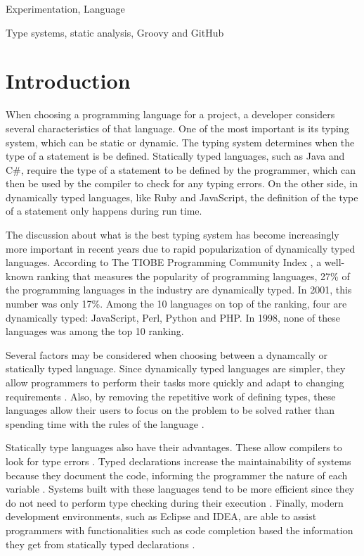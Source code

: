 \documentclass[preprint]{sigplanconf}
\begin{document}

\terms
Experimentation, Language

\keywords
Type systems, static analysis, Groovy and GitHub

\section{Introduction}
When choosing a programming language for a project, a developer considers several characteristics of that language.
One of the most important is its typing system, which can be static or dynamic.
The typing system determines when the type of a statement is be defined\cite{types_and_programming_languages}. 
Statically typed languages, such as Java and C\#, require the type of a statement to be defined by the programmer, which can then be used by the compiler to check for any typing errors. 
On the other side, in dynamically typed languages, like Ruby and JavaScript, the definition of the type of a statement only happens during run time.

The discussion about what is the best typing system has become increasingly more important in recent years due to rapid popularization of dynamically typed languages. 
According to The TIOBE Programming Community Index \cite{tiobe}, a well-known ranking that measures the popularity of programming languages, 27\% of the programming languages in the industry are dynamically typed. 
In 2001, this number was only 17\%. 
Among the 10 languages on top of the ranking, four are dynamically typed: JavaScript, Perl, Python and PHP. 
In 1998, none of these languages was among the top 10 ranking.

Several factors may be considered when choosing between a dynamcally or statically typed language. 
Since dynamically typed languages are simpler, they allow programmers to perform their tasks more quickly \cite{types_and_programming_languages} and adapt to changing requirements \cite{gradual_typing}.
Also, by removing the repetitive work of defining types, these languages allow their users to focus on the problem to be solved rather than spending time with the rules of the language \cite{dynamically_typed_languages}.

Statically type languages also have their advantages. 
These allow compilers to look for type errors \cite{should_your_specification_language_be_typed}. 
Typed declarations increase the maintainability of systems because they document the code, informing the programmer the nature of each variable \cite{type_systems,mayer2012static}. 
Systems built with these languages tend to be more efficient since they do not need to perform type checking during their execution \cite{bruce2002foundations,jit}. 
Finally, modern development environments, such as Eclipse and IDEA, are able to assist programmers with functionalities such as code completion based the information
they get from statically typed declarations \cite{bruch2009learning}.
\end{document}

